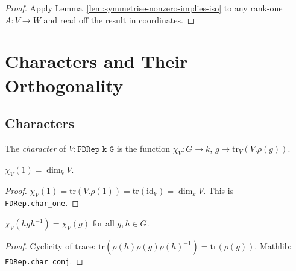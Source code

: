 \begin{proof}
  Apply Lemma~\ref{lem:symmetrise-nonzero-implies-iso} to any rank-one
  $A : V \to W$ and read off the result in coordinates.
\end{proof}


\chapter{Characters and Their Orthogonality}
\label{chap:characters}

\section{Characters}

\begin{definition}
  \label{def:character}
  \mathlibok
  The \emph{character} of $V : \texttt{FDRep k G}$ is the function
  $\chi_V : G \to k$, $g \mapsto \mathrm{tr}_V(V.\rho(g))$.
\end{definition}

\begin{lemma}[$\chi_V(1) = \dim V$]
  \label{lem:char-one}
  \mathlibok
  $\chi_V(1) = \dim_k V$.
\end{lemma}

\begin{proof}
  \leanok
  $\chi_V(1) = \mathrm{tr}(V.\rho(1)) = \mathrm{tr}(\mathrm{id}_V) = \dim_k V$.
  This is \texttt{FDRep.char\_one}.
\end{proof}

\begin{lemma}
  \label{lem:char-conj}
  \mathlibok
  $\chi_V(hgh^{-1}) = \chi_V(g)$ for all $g, h \in G$.
\end{lemma}

\begin{proof}
  \leanok
  Cyclicity of trace: $\mathrm{tr}(\rho(h)\rho(g)\rho(h)^{-1}) = \mathrm{tr}(\rho(g))$.
  Mathlib: \texttt{FDRep.char\_conj}.
\end{proof}

